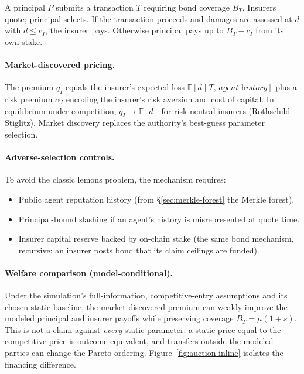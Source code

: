 \documentclass[11pt,a4paper]{article}
\theoremstyle{definition}
\theoremstyle{remark}
\begin{document}
A principal $P$ submits a transaction $T$ requiring bond coverage $B_T$. Insurers quote; principal selects. If the transaction proceeds and damages are assessed at $d$ with $d \leq c_I$, the insurer pays. Otherwise principal pays up to $B_T - c_I$ from its own stake.

\paragraph{Market-discovered pricing.}
The premium $q_I$ equals the insurer's expected loss $\mathbb{E}[d \mid T,\, \textit{agent history}]$ plus a risk premium $\alpha_I$ encoding the insurer's risk aversion and cost of capital. In equilibrium under competition, $q_I \to \mathbb{E}[d]$ for risk-neutral insurers (Rothschild--Stiglitz). Market discovery replaces the authority's best-guess parameter selection.

\paragraph{Adverse-selection controls.}
To avoid the classic lemons problem, the mechanism requires:
\begin{itemize}[nosep]
  \item Public agent reputation history (from \S\ref{sec:merkle-forest} the Merkle forest).
  \item Principal-bound slashing if an agent's history is misrepresented at quote time.
  \item Insurer capital reserve backed by on-chain stake (the same bond mechanism, recursive: an insurer posts bond that its claim ceilings are funded).
\end{itemize}

\paragraph{Welfare comparison (model-conditional).}\label{sec:youle:welfare}
Under the simulation's full-information, competitive-entry assumptions and its chosen static baseline, the market-discovered premium can weakly improve the modeled principal and insurer payoffs while preserving coverage $B_T=\mu(1+s)$. This is not a claim against \emph{every} static parameter: a static price equal to the competitive price is outcome-equivalent, and transfers outside the modeled parties can change the Pareto ordering. Figure~\ref{fig:auction-inline} isolates the financing difference.


\end{document}
